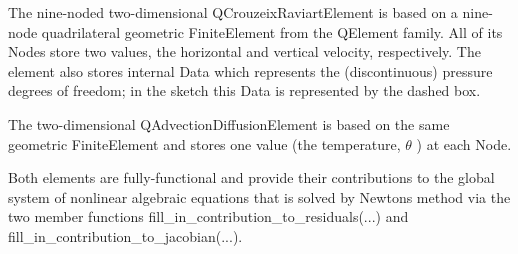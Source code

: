 \begin{DoxyItemize}
\item The nine-\/noded two-\/dimensional {\ttfamily Q\+Crouzeix\+Raviart\+Element} is based on a nine-\/node quadrilateral geometric {\ttfamily Finite\+Element} from the {\ttfamily Q\+Element} family. All of its {\ttfamily Nodes} store two values, the horizontal and vertical velocity, respectively. The element also stores internal {\ttfamily Data} which represents the (discontinuous) pressure degrees of freedom; in the sketch this {\ttfamily Data} is represented by the dashed box. ~\newline
~\newline

\item The two-\/dimensional {\ttfamily Q\+Advection\+Diffusion\+Element} is based on the same geometric {\ttfamily Finite\+Element} and stores one value (the temperature, $ \theta $ ) at each {\ttfamily Node}.
\end{DoxyItemize}Both elements are fully-\/functional and provide their contributions to the global system of nonlinear algebraic equations that is solved by Newton\textquotesingle{}s method via the two member functions {\ttfamily fill\+\_\+in\+\_\+contribution\+\_\+to\+\_\+residuals}(...) and {\ttfamily fill\+\_\+in\+\_\+contribution\+\_\+to\+\_\+jacobian}(...).

